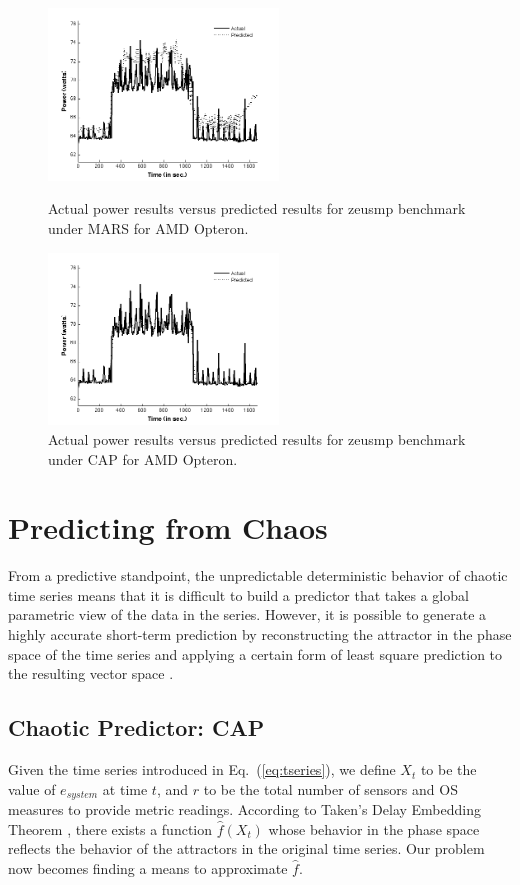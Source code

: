 \documentclass[times,10pt,finalversion]{usetex-v1}
\begin{document}
\begin{figure}[!b]
  \begin{minipage}[b]{0.5\linewidth}
      \centering
      \includegraphics[width=1.0\linewidth,height=1.8in]{amdzeusmars}
      \caption{Actual power results versus predicted results for zeusmp
        benchmark under MARS for AMD Opteron.}
      \label{fig:amdzeusmars}
  \end{minipage}\quad
  \begin{minipage}[b]{0.5\linewidth}
      \centering
      \includegraphics[width=1.0\linewidth,height=1.8in]{amdzeuspredict}
      \caption{Actual power results versus predicted results for zeusmp
        benchmark under CAP for AMD Opteron.}
      \label{fig:amdzeuscapp}
  \end{minipage}
\end{figure}
\section{Predicting from Chaos}
\label{sec:cappredict}
From a predictive standpoint, the unpredictable deterministic behavior
of chaotic time series means that it is difficult to build a predictor
that takes a global parametric view of the data in the series.  However,
it is possible to generate a highly accurate short-term prediction by
reconstructing the attractor in the phase space of the time series and
applying a certain form of least square prediction to the resulting vector
space \cite{Itoh1995}.
\subsection{Chaotic Predictor: CAP}
\label{sec:cap}
Given the time series introduced in Eq.~(\ref{eq:tseries}), we define
$X_{t}$ to be the value of $e_{system}$ at time $t$, and $r$ to be the
total number of sensors and OS measures to provide metric readings.
According to Taken's Delay Embedding Theorem \cite{Sprott2003}, there
exists a function $\hat{f}(X_{t})$ whose behavior in the phase space
reflects the behavior of the attractors in the original time series.
Our problem now becomes finding a means to approximate $\hat{f}$.
\end{document}
